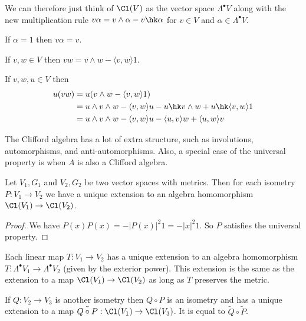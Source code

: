 \begin{remark*}
    We can therefore just think of $\Cl(V)$ as the vector space $\Lambda^\bullet V$ along with the new multiplication rule $v\alpha = v\wedge \alpha - v\hk \alpha$ for $v\in V$ and $\alpha\in \Lambda^\bullet V$.
\end{remark*}
\begin{example}
    If $\alpha = 1$ then $v\alpha = v$.

    If $v,w\in V$ then $vw = v\wedge w - \langle v,w\rangle 1$.

    If $v,w,u \in V$ then 
    \begin{align*}u(vw) &= u(v\wedge w-\langle v,w\rangle 1)\\ &= u\wedge v \wedge w - \langle v,w\rangle u - u\hk v \wedge w + u \hk \langle v,w\rangle 1\\
    &= u\wedge v \wedge w - \langle v,w\rangle u - \langle u,v\rangle w + \langle u,w\rangle v\end{align*}
\end{example}

The Clifford algebra has a lot of extra structure, such as involutions, automorphisms, and anti-automorphisms. Also, a special case of the universal property is when $A$ is also a Clifford algebra.

\begin{thm}
    Let $V_1,G_1$ and $V_2,G_2$ be two vector spaces with metrics. Then for each isometry $P : V_1\to V_2$ we have a unique extension to an algebra homomorphism $\Cl(V_1)\to \Cl(V_2)$. 
\end{thm}
\begin{proof}
    We have $P(x)P(x) = -|P(x)|^2 1 = -|x|^2 1$. So $P$ satisfies the universal property.
\end{proof}

\begin{remark*}
    Each linear map $T : V_1 \to V_2$ has a unique extension to an algebra homomorphism $T : \Lambda^\bullet V_1 \to \Lambda^\bullet V_2$ (given by the exterior power). This extension is the same as the extension to a map $\Cl(V_1)\to \Cl(V_2)$ as long as $T$ preserves the metric.
\end{remark*}
\begin{remark*}
    If $Q : V_2 \to V_3$ is another isometry then $Q\circ P$ is an isometry and has a unique extension to a map $\tilde{Q\circ P} :\Cl(V_1)\to \Cl(V_3)$. It is equal to $\tilde{Q}\circ\tilde{P}$.
\end{remark*}

